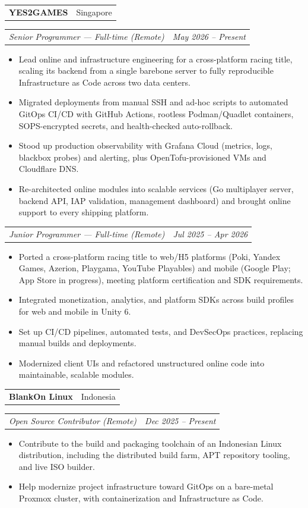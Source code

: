 \documentclass[10pt,a4paper]{article}
\makeatletter
\newcommand{\company}[2]{%
  \vspace{0.28em}%
  \begin{tabularx}{\textwidth}{@{}Xr@{}}
    \textbf{#1} & \textcolor{muted}{#2}
  \end{tabularx}\vspace{-0.45em}
}
\newcommand{\role}[2]{%
  \begin{tabularx}{\textwidth}{@{}Xr@{}}
    \textit{#1} & \textit{#2}
  \end{tabularx}\vspace{-0.55em}
}
\makeatother
\begin{document}
\company{YES2GAMES}{Singapore}
\role{Senior Programmer --- Full-time (Remote)}{May 2026 -- Present}
\begin{itemize}
  \item Lead online and infrastructure engineering for a cross-platform racing title, scaling its backend from a single barebone server to fully reproducible Infrastructure as Code across two data centers.
  \item Migrated deployments from manual SSH and ad-hoc scripts to automated GitOps CI/CD with GitHub Actions, rootless Podman/Quadlet containers, SOPS-encrypted secrets, and health-checked auto-rollback.
  \item Stood up production observability with Grafana Cloud (metrics, logs, blackbox probes) and alerting, plus OpenTofu-provisioned VMs and Cloudflare DNS.
  \item Re-architected online modules into scalable services (Go multiplayer server, backend API, IAP validation, management dashboard) and brought online support to every shipping platform.
\end{itemize}
\role{Junior Programmer --- Full-time (Remote)}{Jul 2025 -- Apr 2026}
\begin{itemize}
  \item Ported a cross-platform racing title to web/H5 platforms (Poki, Yandex Games, Azerion, Playgama, YouTube Playables) and mobile (Google Play; App Store in progress), meeting platform certification and SDK requirements.
  \item Integrated monetization, analytics, and platform SDKs across build profiles for web and mobile in Unity 6.
  \item Set up CI/CD pipelines, automated tests, and DevSecOps practices, replacing manual builds and deployments.
  \item Modernized client UIs and refactored unstructured online code into maintainable, scalable modules.
\end{itemize}

\company{BlankOn Linux}{Indonesia}
\role{Open Source Contributor (Remote)}{Dec 2025 -- Present}
\begin{itemize}
  \item Contribute to the build and packaging toolchain of an Indonesian Linux distribution, including the distributed build farm, APT repository tooling, and live ISO builder.
  \item Help modernize project infrastructure toward GitOps on a bare-metal Proxmox cluster, with containerization and Infrastructure as Code.
\end{itemize}
\end{document}
